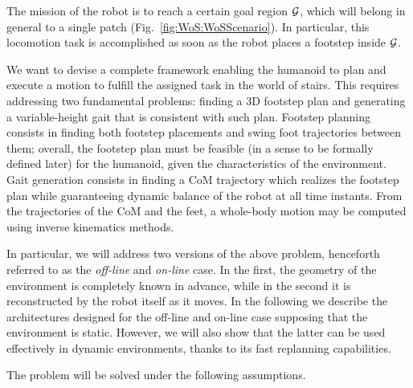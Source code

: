 The mission of the robot is to reach a certain goal region $\cal G$, which will
belong in general to a single patch (Fig.~\ref{fig:WoS:WoSScenario}).
In particular, this locomotion task is accomplished as soon as the robot
places a footstep inside $\cal G$.

We want to devise a complete framework enabling the humanoid to plan and
execute a motion to fulfill the assigned task in the world of stairs.
This requires addressing two fundamental problems: finding a 3D footstep plan
and generating a variable-height gait that is consistent with such plan.
Footstep planning consists in finding both footstep placements and swing foot
trajectories between them; overall, the footstep plan must be feasible
(in a sense to be formally defined later) for the humanoid, given the
characteristics of the environment. Gait generation consists in finding a
CoM trajectory which realizes the footstep plan while guaranteeing dynamic
balance of the robot at all time instants. From the trajectories of the CoM
and the feet, a whole-body motion may be computed using inverse kinematics
methods.

In particular, we will address two versions of the above problem, henceforth
referred to as the \textit{off-line} and \textit{on-line} case. In the first,
the geometry of the environment is completely known in advance, while in the
second it is reconstructed by the robot itself as it moves. 
In the following we describe the architectures designed for the off-line
and on-line case supposing that the environment is static.
However, we will also show that the latter can be used effectively in
dynamic environments, thanks to its fast replanning capabilities. 

The problem will be solved under the following assumptions.

